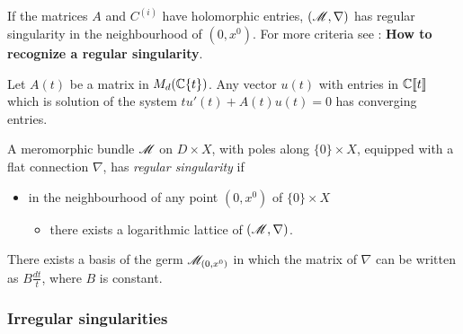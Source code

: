 If the matrices $A$ and $C^{(i)}$ have holomorphic entries, $(\mathscr{M},\nabla)$ has
regular singularity in the neighbourhood of $(0,x^0)$. For more criteria see
\cite[II.4.a]{sabbah2007isomonodromic}: \textbf{How to recognize a regular
  singularity}.
\begin{prop}
  Let $A(t)$ be a matrix in $M_d(\mathbb{C}\{t\})$. Any vector $u(t)$ with entries in
  $\mathbb{C}\llbracket t\rrbracket$ which is solution of the system
  $tu'(t)+A(t)u(t)=0$ has converging entries.
\end{prop}
\begin{defn}[II.2.24]
  A meromorphic bundle $\mathscr{M}$ on $D\times X$, with poles along $\{0\}\times X$,
  equipped with a flat connection $\nabla$, has \emph{regular singularity} if
  \begin{itemize}
    \item in the neighbourhood of any point $(0,x^0)$ of $\{0\}\times X$
      \begin{itemize}
        \item there exists a logarithmic lattice of $(\mathscr{M},\nabla)$.
      \end{itemize}
  \end{itemize}
\end{defn}
\begin{thm}
  There exists a basis of the germ $\mathscr{M}_{(0,x^0)}$ in which the matrix of
  $\nabla$ can be written as $B\frac{dt}{t}$, where $B$ is constant.
\end{thm}
\subsubsection{Irregular singularities}
